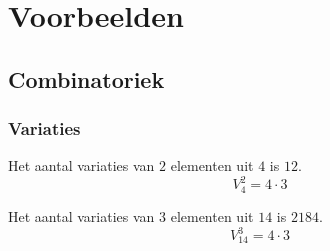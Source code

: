 \documentclass[main.tex]{subfiles}
\begin{document}
\chapter{Voorbeelden}
\label{cha:voorbeelden}



\section{Combinatoriek}
\label{sec:combinatoriek}
\subsection*{Variaties}

\begin{vb}
  Het aantal variaties van $2$ elementen uit $4$ is $12$.
  \[ V_{4}^{2} = 4 \cdot 3 \]
\end{vb}

\begin{vb}
  Het aantal variaties van $3$ elementen uit $14$ is $2184$.
  \[ V_{14}^{3} = 4 \cdot 3 \]
\end{vb}
\end{document}
